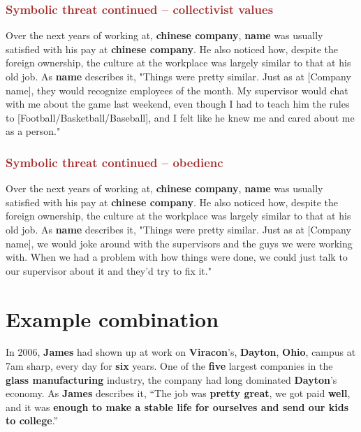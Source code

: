 \documentclass[12pt]{article}
\begin{document}
\subsubsection{\textcolor{brown}{Symbolic threat continued -- collectivist values}}
Over the next years of working at, \textbf{chinese company}, \textbf{name} was usually satisfied with his pay at \textbf{chinese company}. He also noticed how, despite the foreign ownership, the culture at the workplace was largely similar to that at his old job. As \textbf{name} describes it, "Things were pretty similar. Just as at [Company name], they would recognize employees of the month. My supervisor would chat with me about the game last weekend, even though I had to teach him the rules to [Football/Basketball/Baseball], and I felt like he knew me and cared about me as a person."
\subsubsection{\textcolor{brown}{Symbolic threat continued -- obedienc}}

Over the next years of working at, \textbf{chinese company}, \textbf{name} was usually satisfied with his pay at \textbf{chinese company}. He also noticed how, despite the foreign ownership, the culture at the workplace was largely similar to that at his old job. As \textbf{name} describes it, "Things were pretty similar. Just as at [Company name], we would joke around with the supervisors and the guys we were working with. When we had a problem with how things were done, we could just talk to our supervisor about it and they'd try to fix it."

\section{Example combination}


In 2006, \textbf{James} had shown up at work on \textbf{Viracon}'s, \textbf{Dayton}, \textbf{Ohio}, campus at 7am sharp, every day for \textbf{six} years. One of the \textbf{five} largest companies in the \textbf{glass manufacturing} industry, the company had long dominated \textbf{Dayton}'s economy. As \textbf{James} describes it, ``The job was \textbf{pretty great}, we got paid \textbf{well}, and it was \textbf{enough to make a stable life for ourselves and send our kids to college}.''\\
\end{document}
